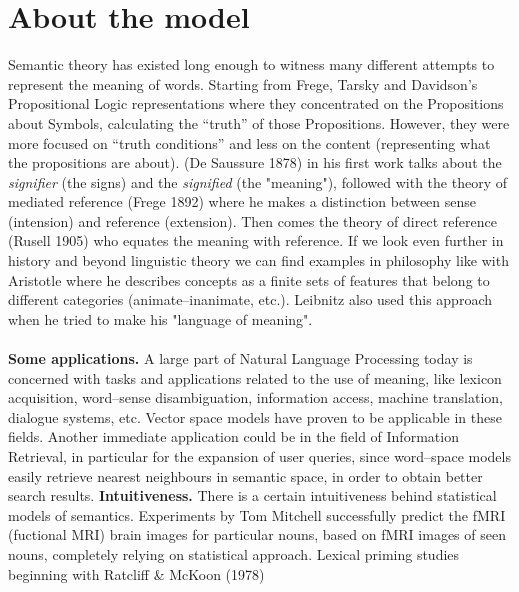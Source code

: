 \section{About the model} \label{aboutTheModel}
Semantic theory has existed long enough to witness many different attempts to represent the meaning of 
words. Starting from Frege, Tarsky and Davidson's Propositional Logic representations where they 
concentrated 
on the Propositions about Symbols, calculating the ``truth'' of those Propositions. However, they were more 
focused on ``truth conditions''  and less on the content (representing what the propositions are about). (De 
Saussure 1878) 
 in his first work talks about the \textit{signifier} (the signs) and the \textit{signified} (the "meaning"), 
followed with the theory of mediated reference (Frege 1892)
where he makes a distinction between
sense (intension) and reference (extension). Then comes the theory of direct reference (Rusell 1905)
who equates the meaning with reference. If we look even further in history and beyond linguistic theory we 
can find examples in philosophy like with Aristotle where he describes concepts as a finite sets of features 
that belong to different categories (animate--inanimate, etc.). Leibnitz also used this approach when he tried 
to make his "language of meaning".
\\\\ 
 \textbf{Some applications.} A large part of Natural Language Processing today is concerned with tasks and applications related to the use of meaning, like  lexicon acquisition, word--sense disambiguation, information access, machine translation, dialogue systems, etc. Vector space models have proven to be applicable in these fields. 
Another immediate application could be in the field of Information Retrieval, in particular for the expansion of user queries, since word--space models easily retrieve nearest neighbours in semantic space,  in order to obtain better search results. 
\newline
\newline \textbf{Intuitiveness.}
There is a certain intuitiveness behind statistical models of semantics. Experiments by Tom Mitchell\cite{mitchell2008} successfully predict the fMRI (fuctional MRI) brain images for particular nouns, based on fMRI images of seen nouns, completely relying on statistical approach. Lexical priming studies beginning with Ratcliff \& McKoon (1978)
